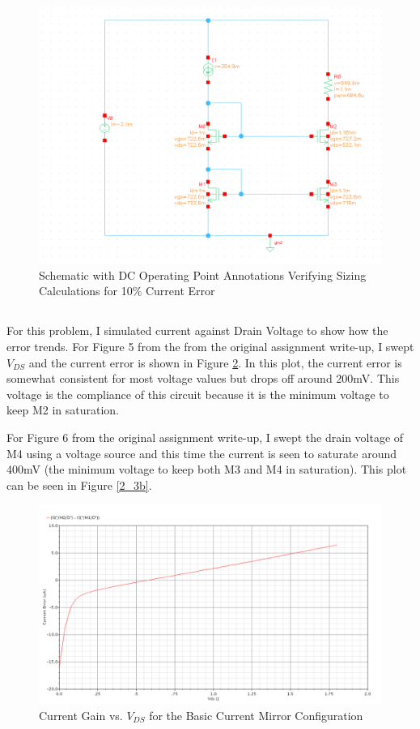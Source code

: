 \documentclass{article}
\begin{document}
\begin{figure}[H]
\centering
\includegraphics[width=6in]{p2_2_dcop.png}
\caption{Schematic with DC Operating Point Annotations Verifying Sizing Calculations for 10\% Current Error}
\label{2_2_10p_dcop}
\end{figure}
\newpage

\subsection{}
For this problem, I simulated current against Drain Voltage to show how the error trends. For Figure 5 from the from the original assignment write-up, I swept $V_{DS}$ and the current error is shown in Figure \ref{2_3a}. In this plot, the current error is somewhat consistent for most voltage values but drops off around 200mV. This voltage is the compliance of this circuit because it is the minimum voltage to keep M2 in saturation.

For Figure 6 from the original assignment write-up, I swept the drain voltage of M4 using a voltage source and this time the current is seen to saturate around 400mV (the minimum voltage to keep both M3 and M4 in saturation). This plot can be seen in Figure \ref{2_3b}.

\begin{figure}[H]
\centering
\includegraphics[width=6in]{p2_3_1}
\caption{Current Gain vs. $V_{DS}$ for the Basic Current Mirror Configuration}
\label{2_3a}
\end{figure}
\end{document}
